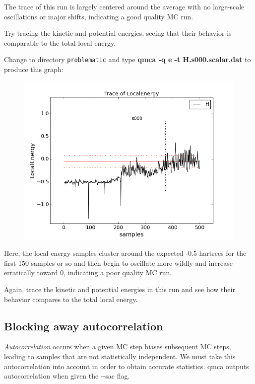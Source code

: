 The trace of this run is largely centered around the average with no
large-scale oscillations or major shifts, indicating a good quality MC run. 

Try tracing the kinetic and potential energies, seeing that their behavior is
comparable to the total local energy.

Change to directory \texttt{problematic} and type \textbf{qmca -q e -t
H.s000.scalar.dat} to produce this graph:

\FloatBarrier
\begin{figure}[ht!]
\begin{center}
\includegraphics[trim = 0mm 0mm 0mm 0mm, clip,width=0.75\columnwidth]{./figures/lab_qmc_statistics_tracing2}
\end{center}
\end{figure}
\FloatBarrier


Here, the local energy samples cluster around the expected -0.5 hartrees for the
first 150 samples or so and then begin to oscillate more wildly and increase
erratically toward 0, indicating a poor quality MC run.

Again, trace the kinetic and potential energies in this run and see how their
behavior compares to the total local energy.

\subsection{Blocking away autocorrelation}

\textit{Autocorrelation} occurs when a given MC step biases subsequent MC
steps, leading to samples that are not statistically independent.  We must take
this autocorrelation into account in order to obtain accurate statistics.  qmca
outputs autocorrelation when given the {-}{-}sac flag.

